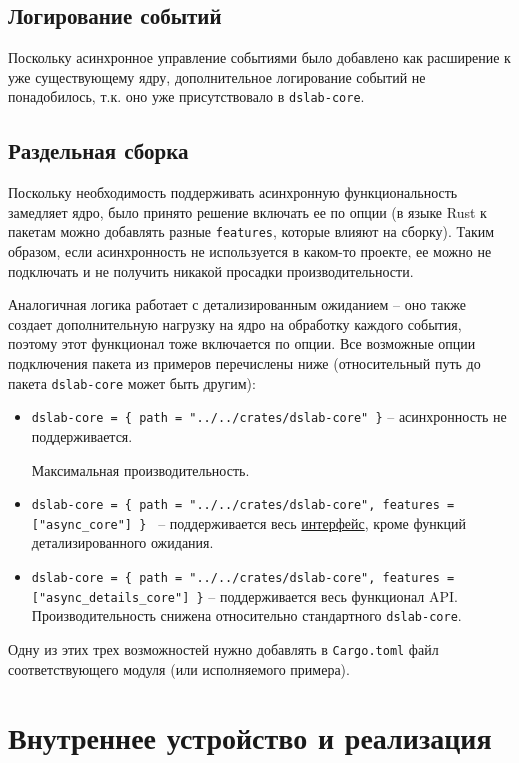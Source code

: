 \subsection{Логирование событий}

Поскольку асинхронное управление событиями было добавлено как расширение к уже существующему ядру, дополнительное логирование событий не понадобилось, т.к. оно уже присутствовало в \texttt{dslab-core}.

\subsection{Раздельная сборка}

Поскольку необходимость поддерживать асинхронную функциональность замедляет ядро, было принято решение включать ее по опции (в языке Rust к пакетам можно добавлять разные \texttt{features}, которые влияют на сборку). Таким образом, если асинхронность не используется в каком-то проекте, ее можно не подключать и не получить никакой просадки производительности. 

Аналогичная логика работает с детализированным ожиданием -- оно также создает дополнительную нагрузку на ядро на обработку каждого события, поэтому этот функционал тоже включается по опции. Все возможные опции подключения пакета из примеров перечислены ниже (относительный путь до пакета \texttt{dslab-core} может быть другим): 
\begin{itemize}
    \item \small \texttt{dslab-core = \{ path = "../../crates/dslab-core" \}} -- асинхронность не поддерживается. 
    
    Максимальная производительность. 
    \item \small \texttt{dslab-core = \{ path = "../../crates/dslab-core", features = ["async\_core"] \} } -- поддерживается весь \hyperref[interface]{интерфейс}, кроме функций детализированного ожидания. 
    \item \small \texttt{dslab-core = \{ path = "../../crates/dslab-core", features = ["async\_details\_core"] \}} -- поддерживается весь функционал API. Производительность снижена относительно стандартного \texttt{dslab-core}.
\end{itemize}
Одну из этих трех возможностей нужно добавлять в \texttt{Cargo.toml} файл соответствующего модуля (или исполняемого примера).


\section{Внутреннее устройство и реализация}

